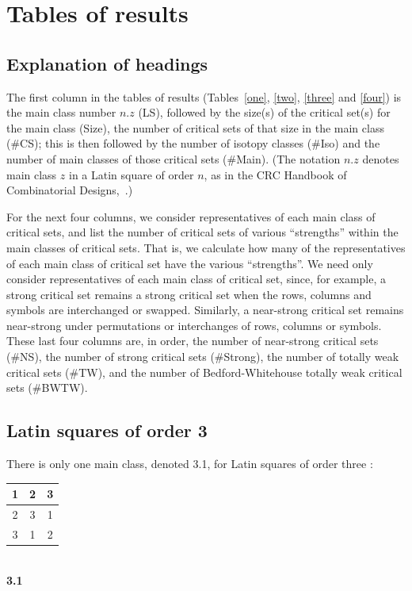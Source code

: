 \documentclass[12pt]{report}
\begin{document}
\section{Tables of results}

\subsection{Explanation of headings}
The first column in the tables of results (Tables~\ref{one}, \ref{two}, 
\ref{three} and \ref{four}) is
the main class number $n.z$ (LS), followed by the size(s) of the critical
set(s) for the main class (Size), the number of critical sets of that
size in the main class (\#CS); this is then followed by the number of
isotopy classes (\#Iso) and the number of main classes of those critical sets (\#Main).
(The notation $n.z$ denotes main class $z$ in
a Latin square of order $n$, as in the CRC Handbook of Combinatorial
Designs,~\cite{crc}.)  


For the next four columns, we consider representatives of each main
class of critical sets, and list the number of critical sets of various
``strengths'' within the main classes of critical sets.  That is,
we calculate how many of the representatives of each main class of
critical set have the various ``strengths''.  We need only consider
representatives of each main class of critical set, since, for example,
a strong critical set remains a strong critical set when the rows, columns and
symbols are interchanged or swapped.  Similarly, a 
near-strong critical set remains near-strong  under
permutations or interchanges of rows, columns or symbols.
These last four columns are, in order, the number of 
near-strong critical sets (\#NS), the number of strong critical sets
(\#Strong), the number of totally weak critical sets (\#TW), and the
number of Bedford-Whitehouse totally weak critical sets (\#BWTW).


\subsection{Latin squares of order 3}

There is only one main class, denoted 3.1, for Latin squares of order three \cite{crc}:
\vspace{5mm}

\begin{center}
\begin{tabular}{|c|c|c|} \hline
1&2&3 \\ \hline
2&3&1 \\ \hline
3&1&2 \\ \hline
\end{tabular} \vspace{3mm}\\
{\bf 3.1}
\end{center}
\vspace{5mm}
\end{document}
